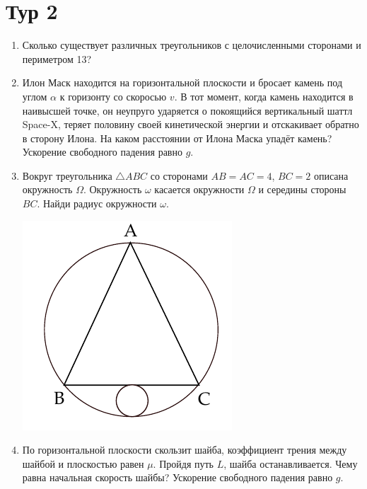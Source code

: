 \documentclass[12pt]{article} %
\begin{document}
\section*{Тур 2}

\begin{enumerate}
\item Сколько существует различных треугольников с целочисленными сторонами и периметром 13?

\item Илон Маск находится на горизонтальной плоскости и бросает камень под углом $\alpha$ к горизонту со скоросью $v$. 
В тот момент, когда камень находится в наивысшей точке, он неупруго ударяется о покоящийся вертикальный шаттл Space-X, 
теряет половину своей кинетической энергии и отскакивает обратно в сторону Илона. 
На каком расстоянии от Илона Маска упадёт камень? Ускорение свободного падения равно $g$.


\item
\begin{minipage}{\linewidth}
        \centering
        \begin{minipage}{0.78\linewidth}
        Вокруг треугольника $\bigtriangleup ABC$ со сторонами $AB = AC = 4$, $BC = 2$ описана окружность $\Omega$. 
        Окружность $\omega$ касается окружности $\Omega$ и середины стороны $BC$. Найди радиус окружности $\omega$.
        \end{minipage}
        \hspace{0.05\linewidth}
        \begin{minipage}{0.15\linewidth}
            \includegraphics[scale=0.5]{drawing.pdf}
        \end{minipage}
    \end{minipage} 


\item
По горизонтальной плоскости скользит шайба, коэффициент трения между шайбой и плоскостью равен $\mu$. 
Пройдя путь $L$, шайба останавливается. Чему равна начальная скорость шайбы? Ускорение свободного падения равно $g$.

\end{enumerate}
    
\end{document}
